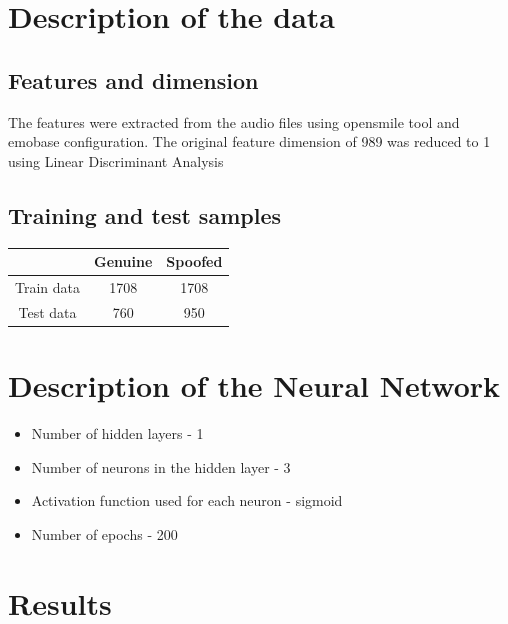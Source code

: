 \documentclass[12pt]{article}
\begin{document}
\begin{titlepage}
\vfill %

\end{titlepage}
\section{Description of the data}
\subsection{Features and dimension}
The features were extracted from the audio files  using opensmile tool and emobase configuration. The original feature dimension of 989 was reduced to 1 using Linear Discriminant Analysis
\subsection{Training and test samples}
\begin{center}
	\begin{tabular}{|c|c|c|}
		\hline 
			   & Genuine & Spoofed \\
			   \hline
		Train data & 1708    & 1708     \\
		\hline 
		Test data  & 760     & 950	 \\		
		\hline
	\end{tabular}
\end{center}
\section{Description of the Neural Network}
\begin{itemize}
	\item Number of hidden layers - 1
	\item Number of neurons in the hidden layer - 3
	\item Activation function used for each neuron - sigmoid
	\item Number of epochs - 200
\end{itemize}
\section{Results}
\end{document}
